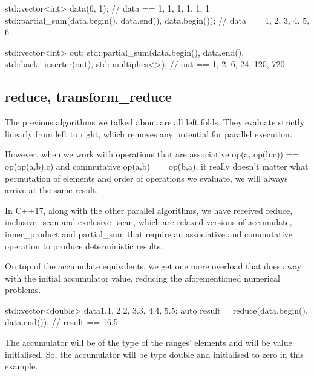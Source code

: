 \begin{box-note}
\begin{cppcode}
std::vector<int> data(6, 1);
// data == {1, 1, 1, 1, 1, 1}
std::partial_sum(data.begin(), data.end(), data.begin());
// data == {1, 2, 3, 4, 5, 6}

std::vector<int> out;
std::partial_sum(data.begin(), data.end(), std::back_inserter(out), std::multiplies<>{});
// out == {1, 2, 6, 24, 120, 720}
\end{cppcode}
\end{box-note}

\subsection{reduce, transform\_reduce}

The previous algorithms we talked about are all left folds. They evaluate strictly linearly from left to right, which removes any potential for parallel execution.

However, when we work with operations that are associative op(a, op(b,c)) == op(op(a,b),c) and commutative op(a,b) == op(b,a), it really doesn’t matter what permutation of elements and order of operations we evaluate, we will always arrive at the same result.

In C++17, along with the other parallel algorithms, we have received reduce, inclusive\_scan and exclusive\_scan, which are relaxed versions of accumulate, inner\_product and partial\_sum that require an associative and commutative operation to produce deterministic results.



On top of the accumulate equivalents, we get one more overload that does away with the initial accumulator value, reducing the aforementioned numerical problems.

\begin{box-note}
\begin{cppcode}
std::vector<double> data{1.1, 2.2, 3.3, 4.4, 5.5};
auto result = reduce(data.begin(), data.end());
// result == 16.5
\end{cppcode}
\end{box-note}

The accumulator will be of the type of the ranges’ elements and will be value initialised. So, the accumulator will be type double and initialised to zero in this example.

